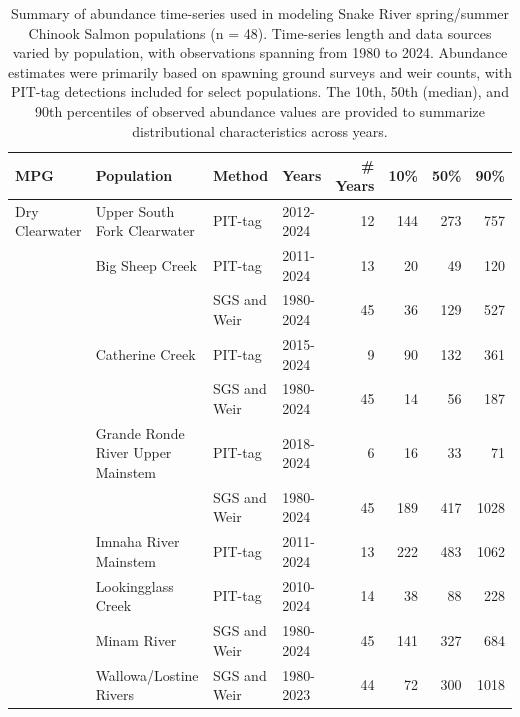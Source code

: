 \documentclass[12pt,a4paper]{article}
\begin{document}
\begin{table}
\centering
\caption{\label{tab:chn-obs}Summary of abundance time-series used in modeling Snake River spring/summer Chinook Salmon populations (n = 48). Time-series length and data sources varied by population, with observations spanning from 1980 to 2024. Abundance estimates were primarily based on spawning ground surveys and weir counts, with PIT-tag detections included for select populations. The 10th, 50th (median), and 90th percentiles of observed abundance values are provided to summarize distributional characteristics across years.}
\centering
\fontsize{8}{10}\selectfont
\begin{tabular}[t]{llllrrrr}
\toprule
MPG & Population & Method & Years & \# Years & 10\% & 50\% & 90\%\\
\midrule
Dry Clearwater & Upper South Fork Clearwater & PIT-tag & 2012-2024 & 12 & 144 & 273 & 757\\

 & Big Sheep Creek & PIT-tag & 2011-2024 & 13 & 20 & 49 & 120\\

 &  & SGS and Weir & 1980-2024 & 45 & 36 & 129 & 527\\

 & \multirow[t]{-2}{*}{\raggedright\arraybackslash Catherine Creek} & PIT-tag & 2015-2024 & 9 & 90 & 132 & 361\\

 &  & SGS and Weir & 1980-2024 & 45 & 14 & 56 & 187\\

 & \multirow[t]{-2}{*}{\raggedright\arraybackslash Grande Ronde River Upper Mainstem} & PIT-tag & 2018-2024 & 6 & 16 & 33 & 71\\

 &  & SGS and Weir & 1980-2024 & 45 & 189 & 417 & 1028\\

 & \multirow[t]{-2}{*}{\raggedright\arraybackslash Imnaha River Mainstem} & PIT-tag & 2011-2024 & 13 & 222 & 483 & 1062\\

 & Lookingglass Creek & PIT-tag & 2010-2024 & 14 & 38 & 88 & 228\\

 & Minam River & SGS and Weir & 1980-2024 & 45 & 141 & 327 & 684\\

 & Wallowa/Lostine Rivers & SGS and Weir & 1980-2023 & 44 & 72 & 300 & 1018\\


\end{tabular}
\end{table}
\end{document}
